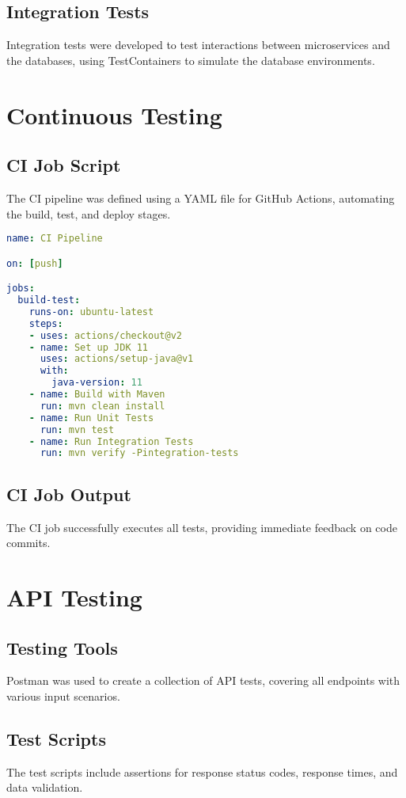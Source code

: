 \documentclass[12pt,a4paper]{report}
\begin{document}
\section{Integration Tests}
Integration tests were developed to test interactions between microservices and the databases, using TestContainers to simulate the database environments.

\chapter{Continuous Testing}
\section{CI Job Script}
The CI pipeline was defined using a YAML file for GitHub Actions, automating the build, test, and deploy stages.

\begin{lstlisting}[language=yaml,caption=CI Pipeline Script]
name: CI Pipeline

on: [push]

jobs:
  build-test:
    runs-on: ubuntu-latest
    steps:
    - uses: actions/checkout@v2
    - name: Set up JDK 11
      uses: actions/setup-java@v1
      with:
        java-version: 11
    - name: Build with Maven
      run: mvn clean install
    - name: Run Unit Tests
      run: mvn test
    - name: Run Integration Tests
      run: mvn verify -Pintegration-tests
\end{lstlisting}

\section{CI Job Output}
The CI job successfully executes all tests, providing immediate feedback on code commits.

\chapter{API Testing}
\section{Testing Tools}
Postman was used to create a collection of API tests, covering all endpoints with various input scenarios.

\section{Test Scripts}
The test scripts include assertions for response status codes, response times, and data validation.
\end{document}
